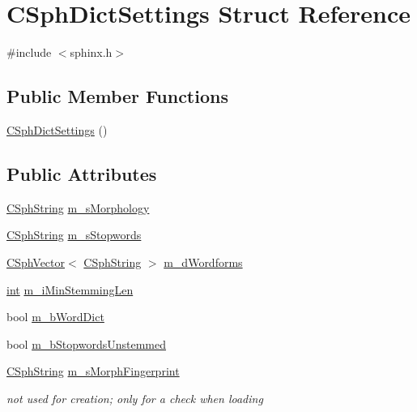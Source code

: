 \hypertarget{structCSphDictSettings}{\section{C\-Sph\-Dict\-Settings Struct Reference}
\label{structCSphDictSettings}
}


{\ttfamily \#include $<$sphinx.\-h$>$}

\subsection*{Public Member Functions}
\begin{DoxyCompactItemize}
\item 
\hyperlink{structCSphDictSettings_a782bf2cc6464ada28fadc27c450a18db}{C\-Sph\-Dict\-Settings} ()
\end{DoxyCompactItemize}
\subsection*{Public Attributes}
\begin{DoxyCompactItemize}
\item 
\hyperlink{structCSphString}{C\-Sph\-String} \hyperlink{structCSphDictSettings_a2240977fc5d354804a9f9066b020455b}{m\-\_\-s\-Morphology}
\item 
\hyperlink{structCSphString}{C\-Sph\-String} \hyperlink{structCSphDictSettings_a34eb75d4352e975a4e9e8527b12c9147}{m\-\_\-s\-Stopwords}
\item 
\hyperlink{classCSphVector}{C\-Sph\-Vector}$<$ \hyperlink{structCSphString}{C\-Sph\-String} $>$ \hyperlink{structCSphDictSettings_a02d89efdc03ac64e3bd317dd3d6c3999}{m\-\_\-d\-Wordforms}
\item 
\hyperlink{sphinxexpr_8cpp_a4a26e8f9cb8b736e0c4cbf4d16de985e}{int} \hyperlink{structCSphDictSettings_a619f550a2158de2e2f41b0609390c9ac}{m\-\_\-i\-Min\-Stemming\-Len}
\item 
bool \hyperlink{structCSphDictSettings_a530fa45d260de7b6eeabd5847b4393c6}{m\-\_\-b\-Word\-Dict}
\item 
bool \hyperlink{structCSphDictSettings_a2c317b69328e84d3a1c9592bfe44bd5b}{m\-\_\-b\-Stopwords\-Unstemmed}
\item 
\hyperlink{structCSphString}{C\-Sph\-String} \hyperlink{structCSphDictSettings_aee29d4b9f2a7087077c697966ebf9315}{m\-\_\-s\-Morph\-Fingerprint}
\begin{DoxyCompactList}\small\item\em not used for creation; only for a check when loading \end{DoxyCompactList}\end{DoxyCompactItemize}


